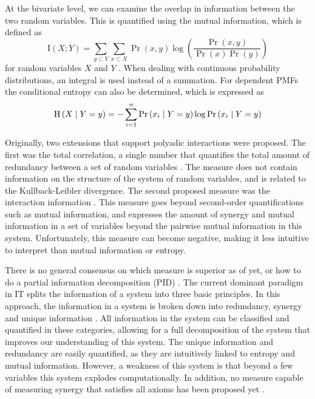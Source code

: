 \documentclass[../main.tex]{subfiles}
\begin{document}
At the bivariate level, we can examine the overlap in information between the two random variables.
This is quantified using the mutual information, which is defined as 
%
\begin{equation}
\label{MI}
\mathrm{I} \left( X;Y \right) = \sum_{y \subset Y} \sum_{x \subset X} \Pr \left( x,y \right) \log (\frac{\Pr \left( x,y \right) }{\Pr \left( x \right) \Pr \left( y \right)})
\end{equation}
%
for random variables $X$ and $Y$ \cite{cover2012elements}.
When dealing with continuous probability distributions, an integral is used instead of a summation.
For dependent PMFs the conditional entropy can also be determined, which is expressed as 
%
\begin{equation}
\mathrm{H} \left(X \;\middle|\; Y = y \right) = -\sum^n_{i=1} \Pr \left( x_i \;\middle|\; Y = y \right) \log \Pr \left( x_i \;\middle|\; Y = y \right)
\end{equation}
%


Originally, two extensions that support polyadic interactions were proposed.
The first was the total correlation, a single number that quantifies the total amount of redundancy between a set of random variables \cite{watanabe1960information}. 
The measure does not contain information on the structure of the system of random variables, and is related to the Kullback-Leibler divergence.
The second proposed measure was the interaction information \cite{mcgill1954multivariate}. 
This measure goes beyond second-order quantifications such as mutual information, and expresses the amount of synergy and mutual information in a set of variables beyond the pairwise mutual information in this system. 
Unfortunately, this measure can become negative, making it less intuitive to interpret than mutual information or entropy.

There is no general consensus on which measure is superior as of yet, or how to do a partial information decomposition (PID) \cite{griffith2011quantifying, williams2010nonnegative}.
The current dominant paradigm in IT splits the information of a system into three basic principles.
In this approach, the information in a system is broken down into redundancy, synergy and unique information \cite{williams2010nonnegative}.
All information in the system can be classified and quantified in these categories, allowing for a full decomposition of the system that improves our understanding of this system.
The unique information and redundancy are easily quantified, as they are intuitively linked to entropy and mutual information.
However, a weakness of this system is that beyond a few variables this system explodes computationally.
In addition, no measure capable of measuring synergy that satisfies all axioms has been proposed yet \cite{griffith2011quantifying}.
\end{document}
